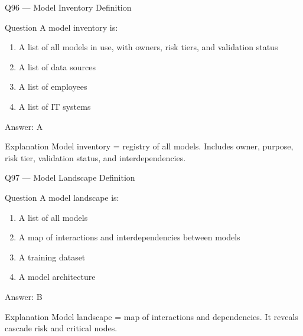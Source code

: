 \documentclass[aspectratio=169,8pt]{beamer}
\begin{document}
	\begin{frame}{Q96 --- Model Inventory Definition}
		\begin{block}{Question}
			A model inventory is:
			\begin{enumerate}
				\item A list of all models in use, with owners, risk tiers, and validation status
				\item A list of data sources
				\item A list of employees
				\item A list of IT systems
			\end{enumerate}
		\end{block}
		\begin{exampleblock}{Answer: A}\end{exampleblock}
		\begin{block}{Explanation}
			Model inventory = registry of all models. Includes owner, purpose, risk tier, validation status, and interdependencies.
		\end{block}
	\end{frame}
	
	\begin{frame}{Q97 --- Model Landscape Definition}
		\begin{block}{Question}
			A model landscape is:
			\begin{enumerate}
				\item A list of all models
				\item A map of interactions and interdependencies between models
				\item A training dataset
				\item A model architecture
			\end{enumerate}
		\end{block}
		\begin{exampleblock}{Answer: B}\end{exampleblock}
		\begin{block}{Explanation}
			Model landscape = map of interactions and dependencies. It reveals cascade risk and critical nodes.
		\end{block}
	\end{frame}
	
\end{document}
